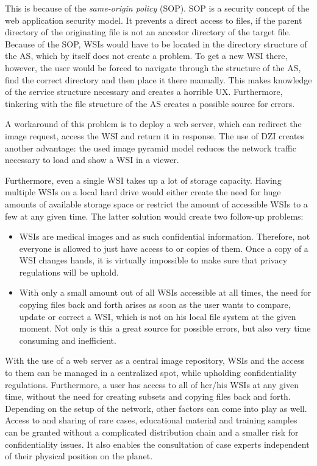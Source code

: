 This is because of the \emph{same-origin policy} (SOP). SOP is a security concept of the web application security model. It prevents a direct access to files, if the parent directory of the originating file is not an ancestor directory of the target file\cite{web:mdn}. Because of the SOP, WSIs would have to be located in the directory structure of the AS, which by itself does not create a problem. To get a new WSI there, however, the user would be forced to navigate through the structure of the AS, find the correct directory and then place it there manually. This makes knowledge of the service structure necessary and creates a horrible UX. Furthermore, tinkering with the file structure of the AS creates a possible source for errors.

A workaround of this problem is to deploy a web server, which can redirect the image request, access the WSI and return it in response\cite{Tseytlin14}. The use of DZI creates another advantage: the used image pyramid model reduces the network traffic necessary to load and show a WSI in a viewer\cite{Cornish13}\cite{DICOM10}.

Furthermore, even a single WSI takes up a lot of storage capacity\cite{Singh11}. Having multiple WSIs on a local hard drive would either create the need for huge amounts of available storage space or restrict the amount of accessible WSIs to a few at any given time. The latter solution would create two follow-up problems:
\begin{itemize}
	\item WSIs are medical images and as such confidential information. Therefore, not everyone is allowed to just have access to or copies of them\cite{COA}\cite{USSanDiego}. Once a copy of a WSI changes hands, it is virtually impossible to make sure that privacy regulations will be uphold.	
	\item With only a small amount out of all WSIs accessible at all times, the need for copying files back and forth arises as soon as the user wants to compare, update or correct a WSI, which is not on his local file system at the given moment. Not only is this a great source for possible errors, but also very time consuming and inefficient.
\end{itemize}

With the use of a web server as a central image repository, WSIs and the access to them can be managed in a centralized spot, while upholding confidentiality regulations. Furthermore, a user has access to all of her/his WSIs at any given time, without the need for creating subsets and copying files back and forth. Depending on the setup of the network, other factors can come into play as well. Access to and sharing of rare cases, educational material and training samples can be granted without a complicated distribution chain and a smaller risk for confidentiality issues. It also enables the consultation of case experts independent of their physical position on the planet\cite{Wilbur09}.


